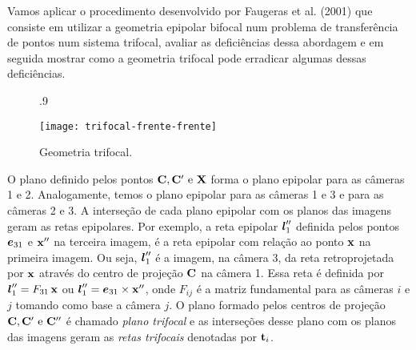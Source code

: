 Vamos aplicar o procedimento desenvolvido por Faugeras et al. (2001) que consiste em utilizar a geometria epipolar bifocal num problema de transferência de pontos num sistema trifocal, avaliar as deficiências dessa abordagem e em seguida mostrar como a geometria trifocal pode erradicar algumas dessas deficiências. 
\begin{figure}[!htb]{.9\textwidth}
\caption{Geometria trifocal.}
\texttt{[image: trifocal-frente-frente]}
\label{fig.trifocal-frente}
\end{figure}
O plano definido pelos pontos ${\bf C}, {\bf C}' \,\,\text{e}\,\, \mathbf{X}$ forma o plano epipolar para as câmeras 1 e 2. Analogamente, temos o plano epipolar para as câmeras 1 e 3 e para as câmeras 2 e 3. A interseção de cada plano epipolar com os planos das imagens geram as retas epipolares. Por exemplo, a reta  epipolar $\boldsymbol{l}''_1$ definida pelos pontos $\boldsymbol{e}_{31}$ e $\mathbf{x}''$ na terceira imagem, é a reta epipolar com relação ao ponto $\mathbf{x}$ na primeira imagem. Ou seja, $\boldsymbol{l}''_1$ é a imagem, na câmera 3, da reta retroprojetada por $\mathbf{x}$ através do centro de projeção ${\bf C}$ na câmera 1. Essa reta é definida por $\boldsymbol{l}''_1=F_{31}\,\mathbf{x}$ ou $\boldsymbol{l}''_1=\boldsymbol{e}_{31}\times\mathbf{x}''$, onde $F_{ij}$ é a matriz fundamental para as câmeras $i$ e $j$ tomando como base a câmera $j$. O plano formado pelos centros de projeção ${\bf C}, {\bf C}' \,\,\text{e}\,\, {\bf C}''$ é chamado {\it plano trifocal} e as interseções desse plano com os planos das imagens geram as {\it retas trifocais} denotadas por ${\bf t}_i$.

